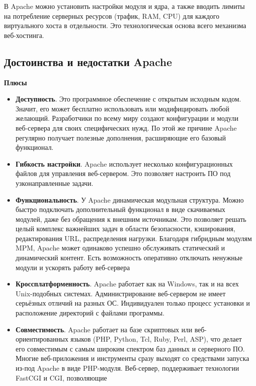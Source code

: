 \documentclass[14pt, a4paper]{article}
\begin{document}
В Apache можно установить настройки модуля и ядра, а также вводить лимиты на потребление серверных 
ресурсов (трафик, RAM, CPU) для каждого виртуального хоста в отдельности. Это технологическая основа 
всего механизма веб-хостинга.


\subsection*{Достоинства и недостатки Apache}
\textbf{Плюсы}
\begin{itemize}
    \item \textbf{Доступность}. Это программное обеспечение с открытым исходным кодом. Значит, его 
    может бесплатно использовать или модифицировать любой желающий. Разработчики по всему миру 
    создают конфигурации и модули веб-сервера для своих специфических нужд. По этой же причине 
    Apache регулярно получает полезные дополнения, расширяющие его базовый функционал.
    \item \textbf{Гибкость настройки}. Apache использует несколько конфигурационных файлов для 
    управления веб-сервером. Это позволяет настроить ПО под узконаправленные задачи.
    \item \textbf{Функциональность}. У Apache динамическая модульная структура. Можно быстро 
    подключать дополнительный функционал в виде скачиваемых модулей, даже без обращения к 
    внешним источникам. Это позволяет решать целый комплекс важнейших задач в области безопасности, 
    кэширования, редактирования URL, распределения нагрузки. Благодаря гибридным модулям MPM, 
    Apache может одинаково успешно обслуживать статический и динамический контент. Есть 
    возможность оперативно отключать ненужные модули и ускорять работу веб-сервера
    \item \textbf{Кроссплатформенность}. Apache работает как на Windows, так и на всех Unix-подобных 
    системах. Администрирование веб-сервером не имеет серьёзных отличий на разных ОС. Индивидуален 
    только процесс установки и расположение директорий с файлами программы.
    \item \textbf{Совместимость}. Apache работает на базе скриптовых или веб-ориентированных языков 
    (PHP, Python, Tcl, Ruby, Perl, ASP), что делает его совместимым с самым широким спектром баз 
    данных и серверного ПО. Многие веб-приложения и инструменты сразу выходят со средствами запуска 
    из-под Apache в виде PHP-модуля. Веб-сервер, поддерживает технологии FastCGI и CGI, позволяющие 

\end{itemize}
\end{document}
